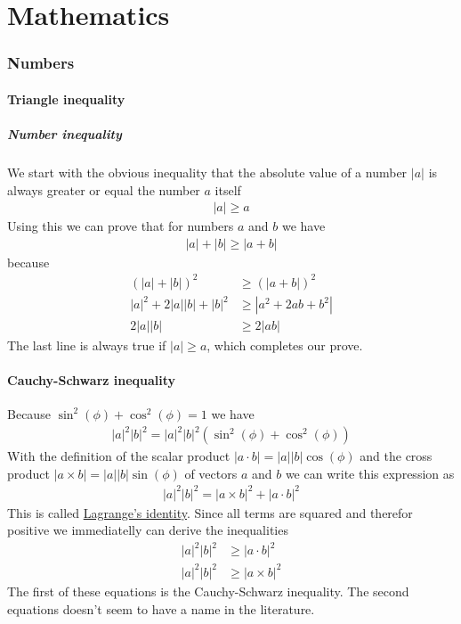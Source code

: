 \part{Mathematics}
\section{Numbers}

\subsection{Triangle inequality}

\subsubsection{Number inequality}

We start with the obvious inequality that the absolute value of a number
$\left|a\right|$ is always greater or equal the number $a$ itself 
\begin{align}
|a| \geq a
\end{align} 
Using this we can prove that for numbers $a$ and $b$ we have 
\begin{align}
|a| + |b|  \geq |a+b|
\end{align} 
because 
\begin{align}
(|a| + |b|)^2  &\geq (|a+b|)^2 \\
|a|^2  + 2|a||b| + |b|^2 &\geq |a^2 + 2ab + b^2| \\
2|a||b| &\geq 2|ab|
\end{align} 
The last line is always true if $|a| \geq a$, which completes our
prove. 

\subsection{Cauchy-Schwarz inequality} 
Because
$\sin^2(\phi) + \cos^2(\phi) = 1$ we have 
\begin{align}
|a|^2|b|^2 = |a|^2|b|^2 (\sin^2(\phi) + \cos^2(\phi))
\end{align} 
With the definition of the scalar product
$|a\cdot b| = |a||b|\cos(\phi)$ and the cross product
$|a\times b| = |a||b|\sin(\phi)$ of vectors $a$ and $b$ we can
write this expression as 
\begin{align}
|a|^2|b|^2 = |a\times b|^2 + |a\cdot b|^2
\end{align} 
This is called \href{https://en.wikipedia.org/wiki/Lagrange\%27s_identity}{Lagrange's identity}. Since all terms are squared and
therefor positive we immediatelly can derive the inequalities 
\begin{align}
|a|^2|b|^2 &\geq |a\cdot b|^2 \\
|a|^2|b|^2 &\geq |a\times b|^2
\end{align} 
The first of these equations is the Cauchy-Schwarz inequality. The
second equations doesn't seem to have a name in the literature.

